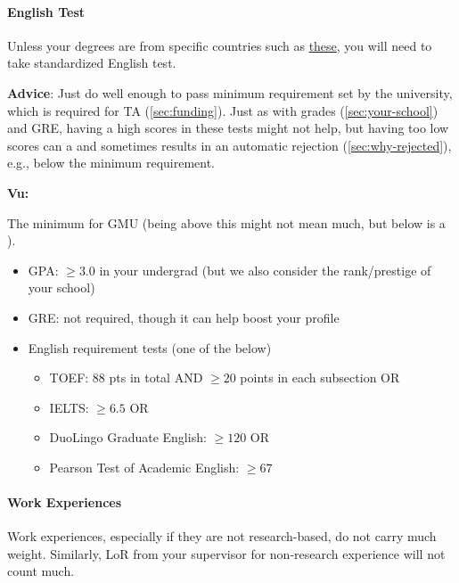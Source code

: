 \documentclass[oneside,11pt,dvipsnames]{book}
\newenvironment{commentbox}[1][]{
  \small
  \begin{mybox}
    {\small \textbf{#1}}
  }{
  \end{mybox}
}
\newcommand{\red}[1]{{\color{red}{#1}}}
\begin{document}
\paragraph{English Test} Unless your degrees are from specific countries such as \href{https://github.com/dynaroars/dynaroars.github.io/wiki/About-GMU#standard-tests-waiver-eligible-countries}{these}, you will need to
take standardized English test.

\textbf{Advice}: Just do well enough to pass minimum requirement set by the university, which is required for TA (\autoref{sec:funding}). Just as with grades (\autoref{sec:your-school}) and GRE, having a high scores in these tests might not help, but having too low scores can a \red{red flag} and sometimes results in an automatic rejection (\autoref{sec:why-rejected}), e.g., below the minimum requirement.


\begin{commentbox}[Vu:]
  The minimum for GMU (being above this might not mean much, but below is a \red{red flag}).
  \begin{itemize}
    \item GPA: $\ge 3.0$ in your undergrad (but we also consider the rank/prestige of your school)
    \item GRE: not required, though it can help boost your profile
    \item English requirement tests (one of the below)
          \begin{itemize}
            \item TOEF: 88 pts in total AND $\ge 20$ points in each subsection OR
            \item IELTS: $\ge 6.5$ OR
            \item DuoLingo Graduate English: $\ge 120$ OR
            \item Pearson Test of Academic English: $\ge 67$
          \end{itemize}
  \end{itemize}
\end{commentbox}

\paragraph{Work Experiences} Work experiences, especially if they are not research-based, do not carry much weight. Similarly, LoR from your supervisor for non-research experience will not count much.
\end{document}
